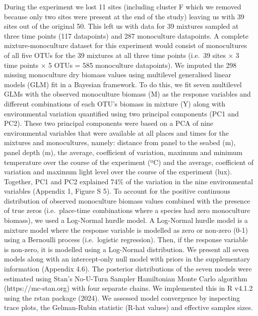 \documentclass[
  letterpaper,
  DIV=11,
  numbers=noendperiod]{scrartcl}
\begin{document}
During the experiment we lost 11 sites (including cluster F which we
removed because only two sites were present at the end of the study)
leaving us with 39 sites out of the original 50. This left us with data
for 39 mixtures sampled at three time points (117 datapoints) and 287
monoculture datapoints. A complete mixture-monoculture dataset for this
experiment would consist of monocultures of all five OTUs for the 39
mixtures at all three time points (i.e.~39 sites × 3 time points × 5
OTUs = 585 monoculture datapoints). We imputed the 298 missing
monoculture dry biomass values using multilevel generalised linear
models (GLM) fit in a Bayesian framework. To do this, we fit seven
multilevel GLMs with the observed monoculture biomass (M) as the
response variables and different combinations of each OTU's biomass in
mixture (Y) along with environmental variation quantified using two
principal components (PC1 and PC2). These two principal components were
based on a PCA of nine environmental variables that were available at
all places and times for the mixtures and monocultures, namely: distance
from panel to the seabed (m), panel depth (m), the average, coefficient
of variation, maximum and minimum temperature over the course of the
experiment (ºC) and the average, coefficient of variation and maximum
light level over the course of the experiment (lux). Together, PC1 and
PC2 explained 74\% of the variation in the nine environmental variables
(Appendix 1, Figure S 5). To account for the positive continuous
distribution of observed monoculture biomass values combined with the
presence of true zeros (i.e.~place-time combinations where a species had
zero monoculture biomass), we used a Log-Normal hurdle model. A
Log-Normal hurdle model is a mixture model where the response variable
is modelled as zero or non-zero (0-1) using a Bernoulli process
(i.e.~logistic regression). Then, if the response variable is non-zero,
it is modelled using a Log-Normal distribution. We present all seven
models along with an intercept-only null model with priors in the
supplementary information (Appendix 4.6). The posterior distributions of
the seven models were estimated using Stan's No-U-Turn Sampler
Hamiltonian Monte Carlo algorithm (https://mc-stan.org) with four
separate chains. We implemented this in R v4.1.2 using the rstan package
(2024). We assessed model convergence by inspecting trace plots, the
Gelman-Rubin statistic (R-hat values) and effective samples sizes.
\end{document}
